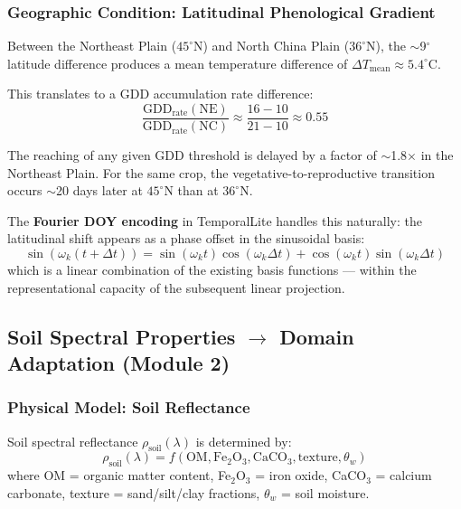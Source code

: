 \subsubsection{Geographic Condition: Latitudinal Phenological Gradient}

Between the Northeast Plain ($45^\circ$N) and North China Plain ($36^\circ$N),
the $\sim$9$^\circ$ latitude difference produces a mean temperature difference
of $\Delta T_{\text{mean}} \approx 5.4^\circ\text{C}$.

This translates to a GDD accumulation rate difference:
\begin{equation}
    \frac{\text{GDD}_{\text{rate}}(\text{NE})}{\text{GDD}_{\text{rate}}(\text{NC})}
    \approx \frac{16 - 10}{21 - 10} \approx 0.55
\end{equation}

The reaching of any given GDD threshold is delayed by a factor of $\sim$1.8$\times$
in the Northeast Plain. For the same crop, the vegetative-to-reproductive
transition occurs $\sim$20 days later at $45^\circ$N than at $36^\circ$N.

The \textbf{Fourier DOY encoding} in TemporalLite handles this naturally:
the latitudinal shift appears as a phase offset in the sinusoidal basis:
\begin{equation}
    \sin(\omega_k (t + \Delta t)) = \sin(\omega_k t)\cos(\omega_k \Delta t) +
    \cos(\omega_k t)\sin(\omega_k \Delta t)
\end{equation}
which is a linear combination of the existing basis functions — within the
representational capacity of the subsequent linear projection.

\subsection{Soil Spectral Properties $\to$ Domain Adaptation (Module 2)}

\subsubsection{Physical Model: Soil Reflectance}

Soil spectral reflectance $\rho_{\text{soil}}(\lambda)$ is determined by:
\begin{equation}
    \rho_{\text{soil}}(\lambda) = f(\text{OM}, \text{Fe}_2\text{O}_3,
    \text{CaCO}_3, \text{texture}, \theta_w)
\end{equation}
where OM = organic matter content, Fe$_2$O$_3$ = iron oxide, CaCO$_3$ =
calcium carbonate, texture = sand/silt/clay fractions, $\theta_w$ = soil moisture.

